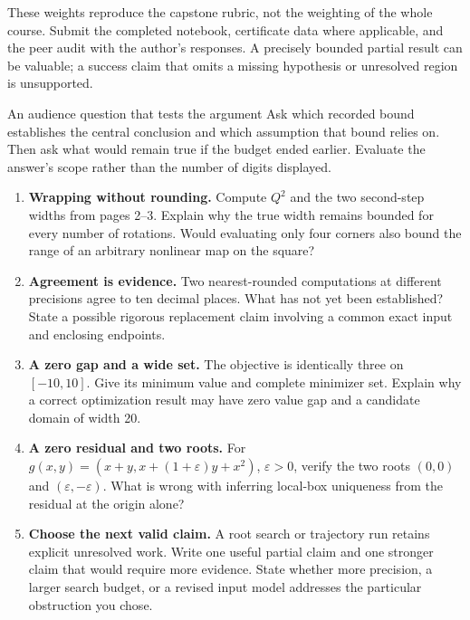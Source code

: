 These weights reproduce the capstone rubric, not the weighting of the
whole course. Submit the completed notebook, certificate data where
applicable, and the peer audit with the author's responses. A precisely
bounded partial result can be valuable; a success claim that omits a
missing hypothesis or unresolved region is unsupported.

\begin{question}{An audience question that tests the argument}
Ask which recorded bound establishes the central conclusion and which
assumption that bound relies on. Then ask what would remain true if the
budget ended earlier. Evaluate the answer's scope rather than the number
of digits displayed.
\end{question}

\newpage
{}
\begin{enumerate}
\item \textbf{Wrapping without rounding.} Compute $Q^2$ and the two
second-step widths from pages 2--3. Explain why the true width remains
bounded for every number of rotations. Would evaluating only four corners
also bound the range of an arbitrary nonlinear map on the square?

\item \textbf{Agreement is evidence.} Two nearest-rounded computations
at different precisions agree to ten decimal places. What has not yet been
established? State a possible rigorous replacement claim involving a common
exact input and enclosing endpoints.

\item \textbf{A zero gap and a wide set.} The objective is identically
three on $[-10,10]$. Give its minimum value and complete minimizer set.
Explain why a correct optimization result may have zero value gap and a
candidate domain of width 20.

\item \textbf{A zero residual and two roots.} For
$g(x,y)=(x+y,x+(1+\varepsilon)y+x^2)$, $\varepsilon>0$, verify the two
roots $(0,0)$ and $(\varepsilon,-\varepsilon)$. What is wrong with
inferring local-box uniqueness from the residual at the origin alone?

\item \textbf{Choose the next valid claim.} A root search or trajectory
run retains explicit unresolved work. Write one useful partial claim and
one stronger claim that would require more evidence. State whether more
precision, a larger search budget, or a revised input model addresses the
particular obstruction you chose.
\end{enumerate}

